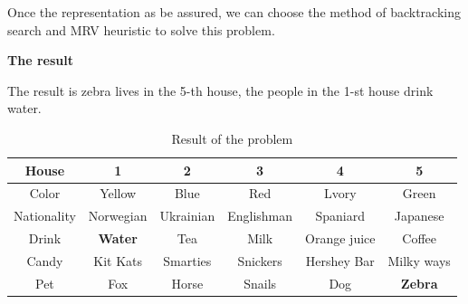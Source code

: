 \documentclass[a4paper,left=2.5cm,right=2.5cm,11pt]{article}
\newcommand{\sihao}{\fontsize{14pt}{\baselineskip}\selectfont}      %
\newcommand{\wuhao}{\fontsize{10.5pt}{\baselineskip}\selectfont}    %
\begin{document}
Once the representation as be assured, we can choose the method of backtracking search  and MRV heuristic to solve this problem.

\sihao \textbf{The result }  \par
The result is zebra lives in the 5-th house, the people in the 1-st house drink water.


\begin{table}[!hbp]
	\centering
	\begin{tabular}{|c|c|c|c|c|c|}
		\hline
		\hline
		House & 1 & 2 & 3 & 4 & 5\\
		\hline
	    Color  &Yellow & Blue & Red &Lvory & Green \\
		\hline
	    Nationality & Norwegian & Ukrainian & Englishman & Spaniard & Japanese \\
		\hline
		Drink & \textbf{Water}  & Tea & Milk & Orange juice & Coffee\\
		\hline
		Candy & Kit Kats & Smarties& Snickers &Hershey Bar & Milky ways \\
		\hline  
		Pet & Fox & Horse & Snails & Dog & \textbf{Zebra} \\
		\hline
	\end{tabular}
	\caption*{Result of the problem}
\end{table} 





\end{document}
